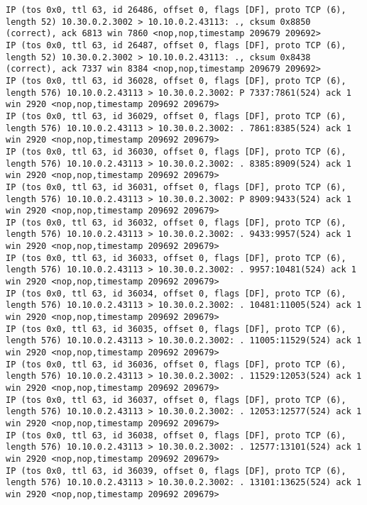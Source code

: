 \documentclass[a4paper,12pt]{article}
\begin{document}
\begin{lstlisting}
IP (tos 0x0, ttl 63, id 26486, offset 0, flags [DF], proto TCP (6), length 52) 10.30.0.2.3002 > 10.10.0.2.43113: ., cksum 0x8850 (correct), ack 6813 win 7860 <nop,nop,timestamp 209679 209692>
IP (tos 0x0, ttl 63, id 26487, offset 0, flags [DF], proto TCP (6), length 52) 10.30.0.2.3002 > 10.10.0.2.43113: ., cksum 0x8438 (correct), ack 7337 win 8384 <nop,nop,timestamp 209679 209692>
IP (tos 0x0, ttl 63, id 36028, offset 0, flags [DF], proto TCP (6), length 576) 10.10.0.2.43113 > 10.30.0.2.3002: P 7337:7861(524) ack 1 win 2920 <nop,nop,timestamp 209692 209679>
IP (tos 0x0, ttl 63, id 36029, offset 0, flags [DF], proto TCP (6), length 576) 10.10.0.2.43113 > 10.30.0.2.3002: . 7861:8385(524) ack 1 win 2920 <nop,nop,timestamp 209692 209679>
IP (tos 0x0, ttl 63, id 36030, offset 0, flags [DF], proto TCP (6), length 576) 10.10.0.2.43113 > 10.30.0.2.3002: . 8385:8909(524) ack 1 win 2920 <nop,nop,timestamp 209692 209679>
IP (tos 0x0, ttl 63, id 36031, offset 0, flags [DF], proto TCP (6), length 576) 10.10.0.2.43113 > 10.30.0.2.3002: P 8909:9433(524) ack 1 win 2920 <nop,nop,timestamp 209692 209679>
IP (tos 0x0, ttl 63, id 36032, offset 0, flags [DF], proto TCP (6), length 576) 10.10.0.2.43113 > 10.30.0.2.3002: . 9433:9957(524) ack 1 win 2920 <nop,nop,timestamp 209692 209679>
IP (tos 0x0, ttl 63, id 36033, offset 0, flags [DF], proto TCP (6), length 576) 10.10.0.2.43113 > 10.30.0.2.3002: . 9957:10481(524) ack 1 win 2920 <nop,nop,timestamp 209692 209679>
IP (tos 0x0, ttl 63, id 36034, offset 0, flags [DF], proto TCP (6), length 576) 10.10.0.2.43113 > 10.30.0.2.3002: . 10481:11005(524) ack 1 win 2920 <nop,nop,timestamp 209692 209679>
IP (tos 0x0, ttl 63, id 36035, offset 0, flags [DF], proto TCP (6), length 576) 10.10.0.2.43113 > 10.30.0.2.3002: . 11005:11529(524) ack 1 win 2920 <nop,nop,timestamp 209692 209679>
IP (tos 0x0, ttl 63, id 36036, offset 0, flags [DF], proto TCP (6), length 576) 10.10.0.2.43113 > 10.30.0.2.3002: . 11529:12053(524) ack 1 win 2920 <nop,nop,timestamp 209692 209679>
IP (tos 0x0, ttl 63, id 36037, offset 0, flags [DF], proto TCP (6), length 576) 10.10.0.2.43113 > 10.30.0.2.3002: . 12053:12577(524) ack 1 win 2920 <nop,nop,timestamp 209692 209679>
IP (tos 0x0, ttl 63, id 36038, offset 0, flags [DF], proto TCP (6), length 576) 10.10.0.2.43113 > 10.30.0.2.3002: . 12577:13101(524) ack 1 win 2920 <nop,nop,timestamp 209692 209679>
IP (tos 0x0, ttl 63, id 36039, offset 0, flags [DF], proto TCP (6), length 576) 10.10.0.2.43113 > 10.30.0.2.3002: . 13101:13625(524) ack 1 win 2920 <nop,nop,timestamp 209692 209679>


\end{lstlisting}
\end{document}

